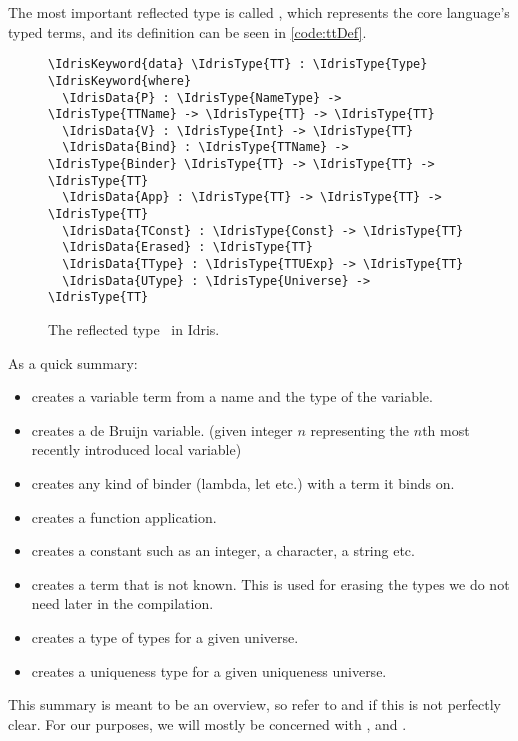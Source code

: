 The most important reflected type is called \TT, which represents the core
language's typed terms, and its definition can be seen in \autoref{code:ttDef}.

\begin{figure}[ht]
\caption{The reflected type \protect\TT\ in Idris.}
\label{code:ttDef}
\begin{Verbatim}[framesep=2mm, label=\footnotesize{\normalfont{Idris}}, labelposition=topline]
\IdrisKeyword{data} \IdrisType{TT} : \IdrisType{Type} \IdrisKeyword{where}
  \IdrisData{P} : \IdrisType{NameType} -> \IdrisType{TTName} -> \IdrisType{TT} -> \IdrisType{TT}
  \IdrisData{V} : \IdrisType{Int} -> \IdrisType{TT}
  \IdrisData{Bind} : \IdrisType{TTName} -> \IdrisType{Binder} \IdrisType{TT} -> \IdrisType{TT} -> \IdrisType{TT}
  \IdrisData{App} : \IdrisType{TT} -> \IdrisType{TT} -> \IdrisType{TT}
  \IdrisData{TConst} : \IdrisType{Const} -> \IdrisType{TT}
  \IdrisData{Erased} : \IdrisType{TT}
  \IdrisData{TType} : \IdrisType{TTUExp} -> \IdrisType{TT}
  \IdrisData{UType} : \IdrisType{Universe} -> \IdrisType{TT}
\end{Verbatim}
\end{figure}

As a quick summary:
\begin{itemize}
\item{} creates a variable term from a name and the type of the variable.
\item{} creates a de Bruijn variable.
(given integer $n$ representing the $n$th most recently introduced local variable)
\item{} creates any kind of binder (lambda, let etc.) with a term it binds on.
\item{} creates a function application.
\item{} creates a constant such as an integer, a character, a string etc.
\item{} creates a term that is not known. This is used for erasing the types we do not need later in the compilation.
\item{} creates a type of types for a given universe.
\item{} creates a uniqueness type for a given uniqueness universe.
\end{itemize}

This summary is meant to be an overview, so refer to \citet{idris} and
\citet{elabref} if this is not perfectly clear. For our purposes, we will mostly
be concerned with ,  and .

